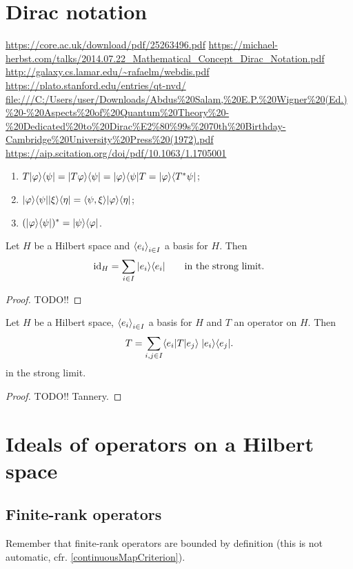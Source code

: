 \section{Dirac notation}
\url{https://core.ac.uk/download/pdf/25263496.pdf}
\url{https://michael-herbst.com/talks/2014.07.22_Mathematical_Concept_Dirac_Notation.pdf}
\url{http://galaxy.cs.lamar.edu/~rafaelm/webdis.pdf}
\url{https://plato.stanford.edu/entries/qt-nvd/}
\url{file:///C:/Users/user/Downloads/Abdus%20Salam,%20E.P.%20Wigner%20(Ed.)%20-%20Aspects%20of%20Quantum%20Theory%20-%20Dedicated%20to%20Dirac%E2%80%99s%2070th%20Birthday-Cambridge%20University%20Press%20(1972).pdf}
\url{https://aip.scitation.org/doi/pdf/10.1063/1.1705001}

\begin{lemma}
\begin{enumerate}
\item $T|\varphi\rangle\langle\psi| = |T\varphi\rangle\langle\psi| = |\varphi\rangle\langle\psi|T = |\varphi\rangle\langle T^*\psi|$;
\item $\ketbra{\varphi}{\psi}\ketbra{\xi}{\eta} = \inner{\psi, \xi}\ketbra{\varphi}{\eta}$;
\item $(|\varphi\rangle\langle\psi|)^* = |\psi\rangle\langle\varphi|$.
\end{enumerate}
\end{lemma}

\begin{lemma}
Let $H$ be a Hilbert space and $\left\langle e_i \right\rangle_{i\in I}$ a basis for $H$. Then
\[ \operatorname{id}_H = \sum_{i\in I}|e_i\rangle\langle e_i| \qquad\text{in the strong limit.} \]
\end{lemma}
\begin{proof}
TODO!!
\end{proof}
\begin{lemma} \label{operatorBraketExpansion}
Let $H$ be a Hilbert space, $\left\langle e_i \right\rangle_{i\in I}$ a basis for $H$ and $T$ an operator on $H$. Then
\[ T = \sum_{i,j\in I}\braket[T]{e_i}{e_j}\; \ketbra{e_i}{e_j}. \]
in the strong limit.
\end{lemma}
\begin{proof}
TODO!! Tannery.
\end{proof}

\section{Ideals of operators on a Hilbert space}

\subsection{Finite-rank operators}
Remember that finite-rank operators are bounded by definition (this is not automatic, cfr. \ref{continuousMapCriterion}).

